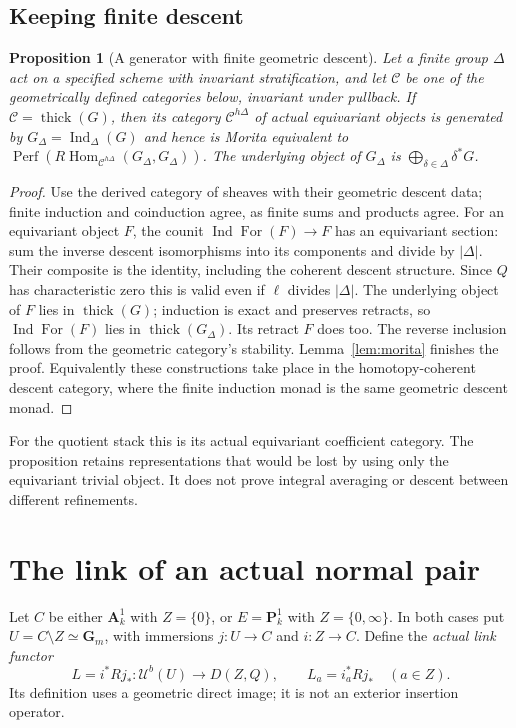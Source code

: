 \documentclass[11pt]{article}
\newtheorem{proposition}[theorem]{Proposition}
\theoremstyle{definition}
\theoremstyle{remark}
\newcommand{\Perf}{\operatorname{Perf}}
\newcommand{\RHom}{R\operatorname{Hom}}
\newcommand{\thick}{\operatorname{thick}}
\begin{document}
\subsection{Keeping finite descent}
\begin{proposition}[A generator with finite geometric descent]
\label{prop:finite-descent}
Let a finite group $\Delta$ act on a specified scheme with invariant
stratification, and let $\mathcal C$ be one of the geometrically defined
categories below, invariant under pullback.  If $\mathcal C=\thick(G)$,
then its category $\mathcal C^{h\Delta}$ of actual equivariant objects
is generated by $G_\Delta=\operatorname{Ind}_\Delta(G)$ and hence is
Morita equivalent to $\Perf(\RHom_{\mathcal C^{h\Delta}}
(G_\Delta,G_\Delta))$.  The underlying object of $G_\Delta$ is
$\bigoplus_{\delta\in\Delta}\delta^*G$.
\end{proposition}
\begin{proof}
Use the derived category of sheaves with their geometric descent data;
finite induction and coinduction agree, as finite sums and products
agree.  For an equivariant object $F$, the counit
$\operatorname{Ind}\operatorname{For}(F)\to F$ has an equivariant
section: sum the inverse descent isomorphisms into its components and
divide by $|\Delta|$.  Their composite is the identity, including the
coherent descent structure.  Since $Q$ has characteristic zero this is
valid even if $\ell$ divides $|\Delta|$.
The underlying object of $F$ lies in $\thick(G)$; induction is exact and
preserves retracts, so $\operatorname{Ind}\operatorname{For}(F)$ lies
in $\thick(G_\Delta)$.  Its retract $F$ does too.  The reverse inclusion
follows from the geometric category's stability.  Lemma~\ref{lem:morita}
finishes the proof.  Equivalently these constructions take place in the
homotopy-coherent descent category, where the finite induction monad
is the same geometric descent monad.
\end{proof}
For the quotient stack this is its actual equivariant coefficient
category.  The proposition retains representations that would be lost
by using only the equivariant trivial object.  It does not prove integral
averaging or descent between different refinements.

\section{The link of an actual normal pair}
Let $C$ be either $\mathbf A^1_k$ with $Z=\{0\}$, or
$E=\mathbf P^1_k$ with $Z=\{0,\infty\}$.  In both cases put
$U=C\setminus Z\simeq\mathbf G_m$, with immersions $j:U\to C$ and
$i:Z\to C$.  Define the \emph{actual link functor}
\[
 L=i^*Rj_*:\mathcal U^b(U)\longrightarrow D(Z,Q),
 \qquad L_a=i_a^*Rj_* \quad (a\in Z).
\]
Its definition uses a geometric direct image; it is not an exterior
insertion operator.
\end{document}
